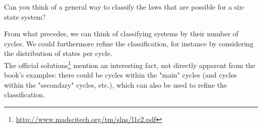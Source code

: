 \documentclass[solutions.tex]{subfiles}
\begin{document}
\maketitle
\begin{exercise}
Can you think of a general way to classify the laws
that are possible for a six-state system?
\end{exercise}
From what precedes, we can think of classifying systems
by their number of cycles. We could furthermore refine
the classification, for instance by considering the
distribution of states per cycle. \\

The official solutions\footnote{\url{http://www.madscitech.org/tm/slns/l1e2.pdf}}
mention an interesting fact, not directly apparent from the book's
examples: there could be cycles within the "main" cycles (and cycles
within the "secondary" cycles, etc.), which can also be used to refine
the classification.
\end{document}
